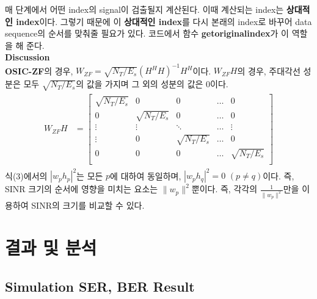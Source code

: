 \documentclass{article}
\newcommand{\bd}{\textbf} %
\begin{document}
매 단계에서 어떤 index의 signal이 검출될지 계산된다. 이때 계산되는 index는 \bd{상대적인 index}이다. 그렇기 때문에 이 \bd{상대적인 index}를 다시 본래의 index로  바꾸어 data sequence의 순서를 맞춰줄 필요가 있다. 코드에서 함수 \bd{get\textunderscore original\textunderscore index}가 이 역할을 해 준다.
\vspace{0.6cm}
\\
\noindent\bd{Discussion}\\
\bd{OSIC-ZF}의 경우, $W_{ZF}=\sqrt{N_T/E_s}(H^H H)^{-1}H^H$이다. $W_{ZF}H$의 경우, 주대각선 성분은 모두 $\sqrt{N_T/E_s}$의 값을 가지며 그 외의 성분의 값은 0이다.
\begin{gather}
	\begin{split}
		W_{ZF}H &=
		\begin{bmatrix}
\sqrt{N_T/E_s} & 0 &0 & \hdots & 0\\
0 & \sqrt{N_T/E_s} &0 & \hdots & 0\\
\vdots & \vdots & \ddots & \hdots & \vdots\\
\vdots & 0 &\sqrt{N_T/E_s} & \hdots & 0\\
0 & 0 &0 & \hdots & \sqrt{N_T/E_s}\\
		\end{bmatrix}
	\end{split}
\end{gather}
식(3)에서의  $|w_p h_p|^2$는 모든 $p$에 대하여 동일하며, $|w_p h_q|^2=0$ $(p\neq q)$이다. 즉, SINR 크기의 순서에 영향을 미치는 요소는 $\lVert w_p \rVert^2$뿐이다. 즉, 각각의 $\frac{1}{\lVert w_p \rVert^2}$만을 이용하여 SINR의 크기를 비교할 수 있다.


\section{결과 및 분석}
\subsection{Simulation SER, BER Result}
\end{document}
